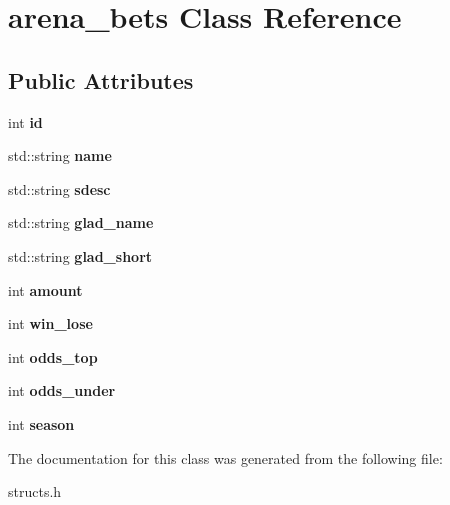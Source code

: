 \hypertarget{classarena__bets}{\section{arena\-\_\-bets Class Reference}
\label{classarena__bets}
}
\subsection*{Public Attributes}
\begin{DoxyCompactItemize}
\item 
\hypertarget{classarena__bets_aa44079288ae2a5b61d87f586cf9a82b9}{int {\bfseries id}}\label{classarena__bets_aa44079288ae2a5b61d87f586cf9a82b9}

\item 
\hypertarget{classarena__bets_a57dd9342f27f9bcae1de156a00d5eb4d}{std\-::string {\bfseries name}}\label{classarena__bets_a57dd9342f27f9bcae1de156a00d5eb4d}

\item 
\hypertarget{classarena__bets_a6aec66c48d66c112748e4469d5a0fa82}{std\-::string {\bfseries sdesc}}\label{classarena__bets_a6aec66c48d66c112748e4469d5a0fa82}

\item 
\hypertarget{classarena__bets_abcbf06b48b74f2fe506448b4aff23055}{std\-::string {\bfseries glad\-\_\-name}}\label{classarena__bets_abcbf06b48b74f2fe506448b4aff23055}

\item 
\hypertarget{classarena__bets_a3418818e2a0af7cd69c8b923f9f009e7}{std\-::string {\bfseries glad\-\_\-short}}\label{classarena__bets_a3418818e2a0af7cd69c8b923f9f009e7}

\item 
\hypertarget{classarena__bets_ac225ff8523480dcbf67fdf701d9ce747}{int {\bfseries amount}}\label{classarena__bets_ac225ff8523480dcbf67fdf701d9ce747}

\item 
\hypertarget{classarena__bets_a71a18e041b55a367a857bb32283604db}{int {\bfseries win\-\_\-lose}}\label{classarena__bets_a71a18e041b55a367a857bb32283604db}

\item 
\hypertarget{classarena__bets_a5598365011281b69cb364ac783aef13a}{int {\bfseries odds\-\_\-top}}\label{classarena__bets_a5598365011281b69cb364ac783aef13a}

\item 
\hypertarget{classarena__bets_a57b49a707822268cc9a8298563e6b3c7}{int {\bfseries odds\-\_\-under}}\label{classarena__bets_a57b49a707822268cc9a8298563e6b3c7}

\item 
\hypertarget{classarena__bets_a18d8189fc2f483d7b339b44f013659c1}{int {\bfseries season}}\label{classarena__bets_a18d8189fc2f483d7b339b44f013659c1}

\end{DoxyCompactItemize}


The documentation for this class was generated from the following file\-:\begin{DoxyCompactItemize}
\item 
structs.\-h\end{DoxyCompactItemize}

